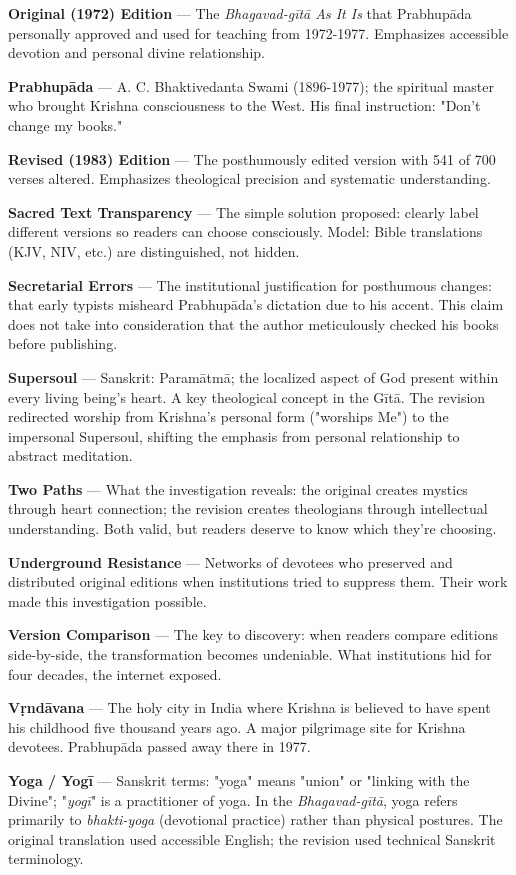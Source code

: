 \documentclass[12pt,twoside]{book}
\begin{document}
\textbf{Original (1972) Edition} — The \emph{Bhagavad-gītā As It Is} that Prabhupāda personally approved and used for teaching from 1972-1977. Emphasizes accessible devotion and personal divine relationship.

\textbf{Prabhupāda} — A. C. Bhaktivedanta Swami (1896-1977); the spiritual master who brought Krishna consciousness to the West. His final instruction: "Don't change my books."

\textbf{Revised (1983) Edition} — The posthumously edited version with 541 of 700 verses altered. Emphasizes theological precision and systematic understanding.

\textbf{Sacred Text Transparency} — The simple solution proposed: clearly label different versions so readers can choose consciously. Model: Bible translations (KJV, NIV, etc.) are distinguished, not hidden.

\textbf{Secretarial Errors} — The institutional justification for posthumous changes: that early typists misheard Prabhupāda's dictation due to his accent. This claim does not take into consideration that the author meticulously checked his books before publishing.

\textbf{Supersoul} — Sanskrit: Paramātmā; the localized aspect of God present within every living being's heart. A key theological concept in the Gītā. The revision redirected worship from Krishna's personal form ("worships Me") to the impersonal Supersoul, shifting the emphasis from personal relationship to abstract meditation.

\textbf{Two Paths} — What the investigation reveals: the original creates mystics through heart connection; the revision creates theologians through intellectual understanding. Both valid, but readers deserve to know which they're choosing.

\textbf{Underground Resistance} — Networks of devotees who preserved and distributed original editions when institutions tried to suppress them. Their work made this investigation possible.

\textbf{Version Comparison} — The key to discovery: when readers compare editions side-by-side, the transformation becomes undeniable. What institutions hid for four decades, the internet exposed.

\textbf{Vṛndāvana} — The holy city in India where Krishna is believed to have spent his childhood five thousand years ago. A major pilgrimage site for Krishna devotees. Prabhupāda passed away there in 1977.

\textbf{Yoga / Yogī} — Sanskrit terms: "yoga" means "union" or "linking with the Divine"; "\emph{yogī}" is a practitioner of yoga. In the \emph{Bhagavad-gītā}, yoga refers primarily to \emph{bhakti-yoga} (devotional practice) rather than physical postures. The original translation used accessible English; the revision used technical Sanskrit terminology.
\end{document}
